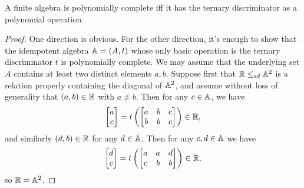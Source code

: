 \documentclass[letterpaper,11pt]{article}
\begin{document}
\begin{prop} A finite algebra is polynomially complete iff it has the ternary discriminator as a polynomial operation.
\end{prop}
\begin{proof} One direction is obvious. For the other direction, it's enough to show that the idempotent algebra $\mathbb{A} = (A,t)$ whose only basic operation is the ternary discriminator $t$ is polynomially complete. We may assume that the underlying set $A$ contains at least two distinct elements $a,b$. Suppose first that $\mathbb{R} \le_{sd} \mathbb{A}^2$ is a relation properly containing the diagonal of $\mathbb{A}^2$, and assume without loss of generality that $(a,b) \in \mathbb{R}$ with $a \ne b$. Then for any $c \in \mathbb{A}$, we have
\[
\begin{bmatrix} a\\ c\end{bmatrix} = t\left(\begin{bmatrix} a & b & c\\ b & b & c \end{bmatrix}\right) \in \mathbb{R},
\]
and similarly $(d,b) \in \mathbb{R}$ for any $d \in \mathbb{A}$. Then for any $c,d \in \mathbb{A}$ we have
\[
\begin{bmatrix} d\\ c\end{bmatrix} = t\left(\begin{bmatrix} a & a & d\\ c & b & b \end{bmatrix}\right) \in \mathbb{R},
\]
so $\mathbb{R} = \mathbb{A}^2$.


\end{proof}
\end{document}
